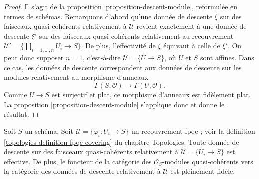\begin{proof}
Il s'agit de la proposition \ref{proposition-descent-module},
reformulée en termes de schémas.
Remarquons d'abord qu'une donnée de descente $\xi$ sur des faisceaux
quasi-cohérents relativement à $\mathcal{U}$ revient exactement
à une donnée de descente $\xi'$ sur des faisceaux quasi-cohérents
relativement au recouvrement
$\mathcal{U}' = \{\coprod_{i = 1, \ldots, n} U_i \to S\}$.
De plus, l'effectivité de $\xi$ équivaut à celle de $\xi'$.
On peut donc supposer $n = 1$, c'est-à-dire $\mathcal{U} = \{U \to S\}$,
où $U$ et $S$ sont affines.
Dans ce cas, les données de descente correspondent aux données
de descente sur les modules relativement au morphisme d'anneaux
$$
\Gamma(S, \mathcal{O})
\longrightarrow
\Gamma(U, \mathcal{O}).
$$
Comme $U \to S$ est surjectif et plat, ce morphisme d'anneaux
est fidèlement plat. La proposition \ref{proposition-descent-module}
s'applique donc et donne le résultat.
\end{proof}

\begin{proposition}
\label{proposition-fpqc-descent-quasi-coherent}
Soit $S$ un schéma.
Soit $\mathcal{U} = \{\varphi_i : U_i \to S\}$ un recouvrement fpqc ;
voir la définition \ref{topologies-definition-fpqc-covering} du chapitre Topologies.
Toute donnée de descente sur des faisceaux quasi-cohérents
relativement à $\mathcal{U} = \{U_i \to S\}$ est effective.
De plus, le foncteur de la catégorie des $\mathcal{O}_S$-modules
quasi-cohérents vers la catégorie des données de descente
relativement à $\mathcal{U}$ est pleinement fidèle.
\end{proposition}

